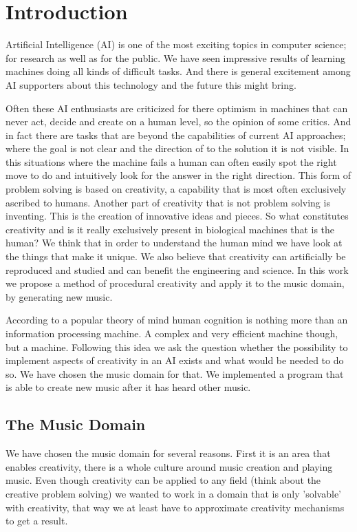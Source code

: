 \section{Introduction} 
Artificial Intelligence (AI) is one of the most exciting topics in computer science; for research as well as for the public. We have seen impressive results of learning machines doing all kinds of difficult tasks. And there is general excitement among AI supporters about this technology and the future this might bring. 

Often these AI enthusiasts are criticized for there optimism in machines that can never act, decide and create on a human level, so the opinion of some critics. And in fact there are tasks that are beyond the capabilities of current AI approaches; where the goal is not clear and the direction of to the solution it is not visible. In this situations where the machine fails a human can often easily spot the right move to do and intuitively look for the answer in the right direction. This form of problem solving is based on creativity, a capability that is most often exclusively ascribed to humans. Another part of creativity that is not problem solving is inventing. This is the creation of innovative ideas and pieces. So what constitutes creativity and is it really exclusively present in biological machines that is the human? We think that in order to understand the human mind we have look at the things that make it unique. We also believe that creativity can artificially be reproduced and studied and can benefit the engineering and science. In this work we propose a method of procedural creativity and apply it to the music domain, by generating new music.

According to a popular theory of mind human cognition is nothing more than an information processing machine. A complex and very efficient machine though, but a machine. Following this idea we ask the question whether the possibility to implement aspects of creativity in an AI exists and what would be needed to do so. We have chosen the music domain for that. We implemented a program that is able to create new music after it has heard other music.

\subsection{The Music Domain}
We have chosen the music domain for several reasons. First it is an area that enables creativity, there is a whole culture around music creation and playing music. Even though creativity can be applied to any field (think about the creative problem solving) we wanted to work in a domain that is only 'solvable' with creativity, that way we at least have to approximate creativity mechanisms to get a result.

